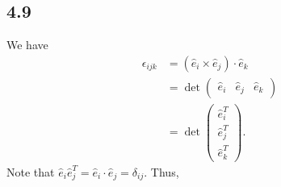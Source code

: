 \documentclass[10pt]{mypackage}
\begin{document}
\subsection{4.9}%
We have
\begin{align*}
  \epsilon_{ijk} &= \left(\hat{e}_i\times \hat{e}_j\right)\cdot \hat{e}_k\\
                 &= \det \begin{pmatrix}\hat{e}_i & \hat{e}_j & \hat{e}_k\end{pmatrix}\\
                 &= \det \begin{pmatrix}\hat{e}_i^T \\ \hat{e}_j^{T}\\\hat{e}_k^{T}\end{pmatrix}.
\end{align*}
Note that $\hat{e}_i\hat{e}_j^{T} = \hat{e}_i\cdot \hat{e}_j = \delta_{ij}$. Thus,
\end{document}
